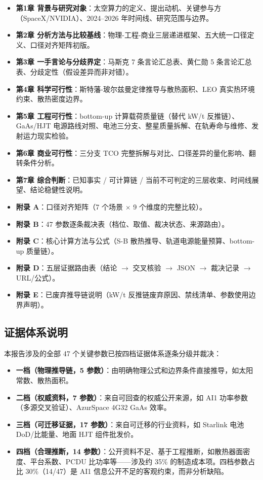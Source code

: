 \begin{itemize}[leftmargin=*]
    \item \textbf{第1章 背景与研究对象}：太空算力的定义、提出动机、关键参与方（SpaceX/NVIDIA）、2024--2026 年时间线、研究范围与边界。
    \item \textbf{第2章 分析方法与比较基线}：物理-工程-商业三层递进框架、五大统一口径定义、口径对齐矩阵初版。
    \item \textbf{第3章 一手言论与分歧界定}：马斯克 7 条言论汇总表、黄仁勋 5 条言论汇总表、分歧定性（假设差异而非对错）。
    \item \textbf{第4章 科学可行性}：斯特藩-玻尔兹曼定律推导与散热面积、LEO 真实热环境约束、散热密度边界。
    \item \textbf{第5章 工程可行性}：bottom-up 计算载荷质量链（替代 kW/t 反推链）、GaAs/HJT 电源路线对照、电池三分支、整星质量拆解、在轨寿命与维修、发射运力现实检验。
    \item \textbf{第6章 商业可行性}：三分支 TCO 完整拆解与对比、口径差异的量化影响、翻转条件分析。
    \item \textbf{第7章 综合判断}：已知事实 / 可计算链 / 当前不可判定的三层收束、时间线展望、结论稳健性说明。
    \item \textbf{附录 A}：口径对齐矩阵（7 个场景 $\times$ 9 个维度的完整比较）。
    \item \textbf{附录 B}：47 参数逐条裁决表（档位、取值、裁决状态、来源路由）。
    \item \textbf{附录 C}：核心计算方法与公式（S-B 散热推导、轨道电源能量预算、bottom-up 质量链）。
    \item \textbf{附录 D}：五层证据路由表（结论 $\to$ 交叉核验 $\to$ JSON $\to$ 裁决记录 $\to$ URL/公式）。
    \item \textbf{附录 E}：已废弃推导链说明（kW/t 反推链废弃原因、禁线清单、参数使用边界声明）。
\end{itemize}

\subsection*{证据体系说明}

本报告涉及的全部 47 个关键参数已按四档证据体系逐条分级并裁决：

\begin{itemize}[leftmargin=*]
    \item \textbf{一档（物理推导链，5 参数）}：由明确物理公式和边界条件直接推导，如太阳常数、散热面积。
    \item \textbf{二档（权威资料，7 参数）}：来自可回查的权威公开来源，如 AI1 功率参数（多源交叉验证）、AzurSpace 4G32 GaAs 效率。
    \item \textbf{三档（可迁移证据，17 参数）}：来自可迁移的行业资料，如 Starlink 电池 DoD/比能量、地面 HJT 组件批发价。
    \item \textbf{四档（合理推断，14 参数）}：公开资料不足、基于工程推断，如散热器面密度、平台系数、PCDU 比功率等——涉及约 35\% 的制造成本项。四档参数占比 30\%（14/47）是 AI1 信息公开不足的客观约束，而非分析缺陷。
\end{itemize}


